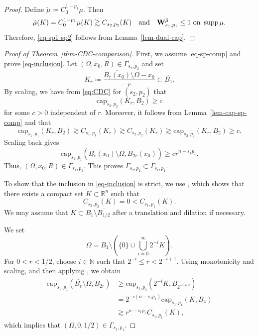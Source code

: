 \documentclass[11pt]{amsart}
\theoremstyle{plain}
\theoremstyle{definition}
\numberwithin{equation}{section}
\DeclareMathOperator*{\supp}{supp}
\begin{document}
\begin{proof}
Define $\tilde{\mu} \coloneqq C_0^{1-p_1}\mu$. Then
\begin{equation*}
\tilde{\mu}(K) = C_0^{1-p_1} \mu(K) \gtrsim C_{s_2, p_2}(K) \quad\text{and}\quad {\bf W}^{\tilde{\mu}}_{s_1, p_1} \leq 1 \text{ on }\supp{\mu}.
\end{equation*}
Therefore, \eqref{eq-sp1-sp2} follows from Lemma~\ref{lem-dual-cap}.
\end{proof}



\begin{proof}[Proof of Theorem~\ref{thm-CDC-comparison}]
First, we assume \eqref{eq-sp-comp} and prove \eqref{eq-inclusion}. Let $(\Omega, x_0, R) \in \Gamma_{s_2, p_2}$ and set
\begin{equation*}
K_r \coloneqq \frac{\overline{B_r(x_0)} \setminus \Omega - x_0}{r} \subset \overline{B_1}.
\end{equation*}
By scaling, we have from \eqref{eq:CDC} for $(s_2, p_2)$ that
\begin{equation*}
\mathrm{cap}_{s_2, p_2}(K_r, B_2) \geq c
\end{equation*}
for some $c>0$ independent of $r$. Moreover, it follows from Lemma~\ref{lem-cap-sp-comp} and \cite[Proposition~5.4]{BBK24} that
\begin{equation*}
\mathrm{cap}_{s_1, p_1}(K_r, B_2) \gtrsim C_{s_1, p_1}(K_r) \gtrsim C_{s_2, p_2}(K_r) \gtrsim \mathrm{cap}_{s_2, p_2}(K_r, B_2) \geq c.
\end{equation*}
Scaling back gives
\begin{equation*}
\mathrm{cap}_{s_1, p_1}(\overline{B_r(x_0)} \setminus \Omega, B_{2r}(x_0)) \geq c r^{n-s_1p_1}.
\end{equation*}
Thus, $(\Omega, x_0, R) \in \Gamma_{s_1, p_1}$. This proves $\Gamma_{s_2, p_2} \subset \Gamma_{s_1, p_1}$.

To show that the inclusion in \eqref{eq-inclusion} is strict, we use \cite[Theorem~8.3]{BBK25}, which shows that there exists a compact set $K \subset \mathbb{R}^n$ such that
\begin{equation*}
C_{s_2, p_2}(K) = 0 < C_{s_1, p_1}(K).
\end{equation*}
We may assume that $K \subset B_1 \setminus \overline{B_{1/2}}$ after a translation and dilation if necessary.

We set
\[
\Omega=B_1\setminus\left(\{0\}\cup\bigcup_{i=0}^\infty2^{-i}K\right).
\]
For $0<r<1/2$, choose $i \in \mathbb{N}$ such that $2^{-i} \leq r < 2^{-i+1}$. Using monotonicity and scaling, and then applying \cite[Proposition~5.4]{BBK24}, we obtain
\begin{align*}
\mathrm{cap}_{s_1, p_1}(\overline{B_r} \setminus \Omega, B_{2r})
&\geq \mathrm{cap}_{s_1, p_1}(2^{-i}K, B_{2^{-i+2}}) \\
&=2^{-i(n-s_1p_1)}\mathrm{cap}_{s_1, p_1}(K, B_4) \\
&\gtrsim r^{n-s_1p_1} C_{s_1, p_1}(K),
\end{align*}
which implies that $(\Omega, 0, 1/2) \in \Gamma_{s_1, p_1}$.


\end{proof}
\end{document}
